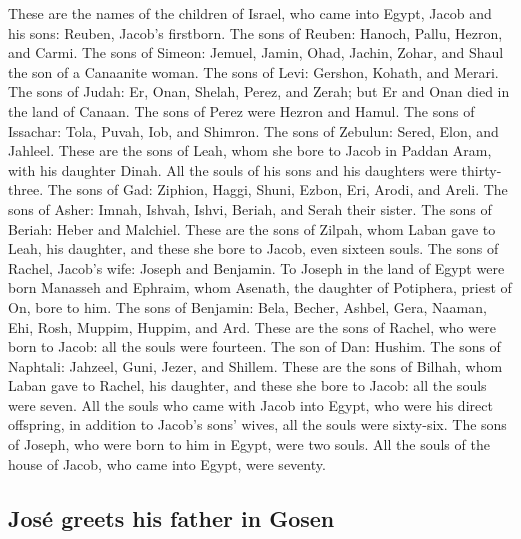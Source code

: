  These are the names of the children of Israel, who came
into Egypt, Jacob and his sons: Reuben, Jacob's firstborn.
 The sons of Reuben: Hanoch, Pallu, Hezron, and Carmi.
 The sons of Simeon: Jemuel, Jamin, Ohad, Jachin, Zohar,
and Shaul the son of a Canaanite woman.  The sons of
Levi: Gershon, Kohath, and Merari.  The sons of Judah:
Er, Onan, Shelah, Perez, and Zerah; but Er and Onan died in the land of
Canaan. The sons of Perez were Hezron and Hamul.  The
sons of Issachar: Tola, Puvah, Iob, and Shimron.  The
sons of Zebulun: Sered, Elon, and Jahleel.  These are the
sons of Leah, whom she bore to Jacob in Paddan Aram, with his daughter
Dinah. All the souls of his sons and his daughters were thirty-three.
 The sons of Gad: Ziphion, Haggi, Shuni, Ezbon, Eri,
Arodi, and Areli.  The sons of Asher: Imnah, Ishvah,
Ishvi, Beriah, and Serah their sister. The sons of Beriah: Heber and
Malchiel.  These are the sons of Zilpah, whom Laban gave
to Leah, his daughter, and these she bore to Jacob, even sixteen souls.
 The sons of Rachel, Jacob's wife: Joseph and Benjamin.
 To Joseph in the land of Egypt were born Manasseh and
Ephraim, whom Asenath, the daughter of Potiphera, priest of On, bore to
him.  The sons of Benjamin: Bela, Becher, Ashbel, Gera,
Naaman, Ehi, Rosh, Muppim, Huppim, and Ard.  These are
the sons of Rachel, who were born to Jacob: all the souls were fourteen.
 The son of Dan: Hushim.  The sons of
Naphtali: Jahzeel, Guni, Jezer, and Shillem.  These are
the sons of Bilhah, whom Laban gave to Rachel, his daughter, and these
she bore to Jacob: all the souls were seven.  All the
souls who came with Jacob into Egypt, who were his direct offspring, in
addition to Jacob's sons' wives, all the souls were sixty-six.
 The sons of Joseph, who were born to him in Egypt, were
two souls. All the souls of the house of Jacob, who came into Egypt,
were seventy.

\hypertarget{josuxe9-greets-his-father-in-gosen}{%
\subsection{José greets his father in
Gosen}\label{josuxe9-greets-his-father-in-gosen}}

